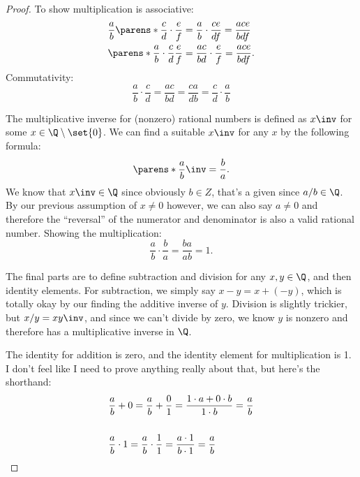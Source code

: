 \documentclass{article}
\begin{document}
\begin{enumerate}
\begin{proof}
          To show multiplication is associative:
          \begin{align*}
            \frac{a}{b}\parens*{\frac{c}{d} \cdot \frac{e}{f}} &= \frac{a}{b}\cdot\frac{ce}{df} = \frac{ace}{bdf}\\
            \parens*{\frac{a}{b} \cdot \frac{c}{d}}\frac{e}{f} &= \frac{ac}{bd}\cdot\frac{e}{f} = \frac{ace}{bdf}.
          \end{align*}
          Commutativity:
          \begin{equation*}
            \frac{a}{b} \cdot \frac{c}{d} = \frac{ac}{bd} = \frac{ca}{db} = \frac{c}{d}\cdot\frac{a}{b}
          \end{equation*}

          The multiplicative inverse for (nonzero) rational numbers is defined as $x\inv$ for some $x \in \Q \setminus \set{0}$.
          We can find a suitable $x\inv$ for any $x$ by the following formula:
          \begin{equation}\label{eq:rational-multiplicative-inverse}
            \parens*{\frac{a}{b}}\inv = \frac{b}{a}.
          \end{equation}
          We know that $x\inv \in \Q$ since obviously $b \in Z$, that's a given since $a/b \in \Q$. By our previous assumption of $x \ne 0$
          however, we can also say $a \ne 0$ and therefore the ``reversal'' of the numerator and denominator is also a valid rational number.
          Showing the multiplication:
          \begin{equation*}
            \frac{a}{b} \cdot \frac{b}{a} = \frac{ba}{ab} = 1.
          \end{equation*}

          The final parts are to define subtraction and division for any $x, y \in \Q$, and then identity elements.
          For subtraction, we simply say $x - y = x + (-y)$, which is totally okay by our finding the additive inverse of $y$.
          Division is slightly trickier, but $x/y = xy\inv$, and since we can't divide by zero, we know $y$ is nonzero and therefore
          has a multiplicative inverse in $\Q$.

          The identity for addition is zero, and the identity element for multiplication is 1.
          I don't feel like I need to prove anything really about that, but here's the shorthand:
          \begin{align*}
            &\frac{a}{b} + 0 = \frac{a}{b} + \frac{0}{1} = \frac{1\cdot a + 0 \cdot b}{1 \cdot b} = \frac{a}{b}\\\\
            &\frac{a}{b} \cdot 1 = \frac{a}{b} \cdot \frac{1}{1} = \frac{a \cdot 1}{b \cdot 1} = \frac{a}{b}\qedhere
          \end{align*}
        \end{proof}


\end{enumerate}
\end{document}
